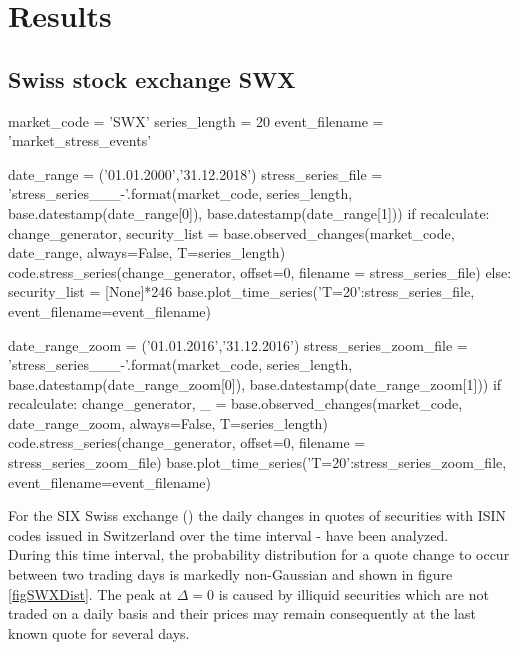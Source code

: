 \documentclass[11pt,twoside,a4paper]{article}
\numberwithin{equation}{section}
\begin{document}
\section{Results}
\subsection{Swiss stock exchange SWX}
\begin{pycode}
market_code = 'SWX'
series_length = 20
event_filename = 'market_stress_events'

date_range = ('01.01.2000','31.12.2018')
stress_series_file = 'stress_series_{}_{}_{}-{}'.format(market_code, series_length, base.datestamp(date_range[0]), base.datestamp(date_range[1]))
if recalculate:
	change_generator, security_list = base.observed_changes(market_code, date_range, always=False, T=series_length)
	code.stress_series(change_generator, offset=0, filename = stress_series_file)
else:
	security_list = [None]*246
base.plot_time_series({'T=20':stress_series_file}, event_filename=event_filename)

date_range_zoom = ('01.01.2016','31.12.2016')
stress_series_zoom_file = 'stress_series_{}_{}_{}-{}'.format(market_code, series_length, base.datestamp(date_range_zoom[0]), base.datestamp(date_range_zoom[1]))
if recalculate:
	change_generator, _ = base.observed_changes(market_code, date_range_zoom, always=False, T=series_length)
	code.stress_series(change_generator, offset=0, filename = stress_series_zoom_file)
base.plot_time_series({'T=20':stress_series_zoom_file}, event_filename=event_filename)
\end{pycode}
For the SIX Swiss exchange () the daily changes in quotes of  securities with ISIN codes issued in Switzerland over the time interval  -  have been analyzed.\\
During this time interval, the probability distribution for a quote change to occur between two trading days is markedly non-Gaussian and shown in figure \ref{figSWXDist}. The peak at $\Delta=0$ is caused by illiquid securities which are not traded on a daily basis and their prices may remain consequently at the last known quote for several days.\\
\end{document}
